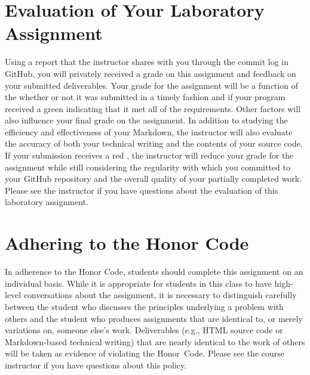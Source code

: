 \documentclass[11pt]{article}
\newcommand{\checkmark}{\ding{51}}
\newcommand{\naughtmark}{\ding{55}}
\begin{document}
\section*{Evaluation of Your Laboratory Assignment}

Using a report that the instructor shares with you through the commit log in GitHub, you will privately received a grade
on this assignment and feedback on your submitted deliverables. Your grade for the assignment will be a function of the
whether or not it was submitted in a timely fashion and if your program received a green \checkmark{} indicating that it
met all of the requirements. Other factors will also influence your final grade on the assignment. In addition to
studying the efficiency and effectiveness of your Markdown, the instructor will also evaluate the accuracy of both your
technical writing and the contents of your source code. If your submission receives a red \naughtmark{}, the instructor
will reduce your grade for the assignment while still considering the regularity with which you committed to your GitHub
repository and the overall quality of your partially completed work. Please see the instructor if you have questions
about the evaluation of this laboratory assignment.

\section*{Adhering to the Honor Code}

In adherence to the Honor Code, students should complete this assignment on an individual basis. While it is appropriate
for students in this class to have high-level conversations about the assignment, it is necessary to distinguish
carefully between the student who discusses the principles underlying a problem with others and the student who produces
assignments that are identical to, or merely variations on, someone else's work. Deliverables (e.g., HTML source code or
Markdown-based technical writing) that are nearly identical to the work of others will be taken as evidence of violating
the \mbox{Honor Code}. Please see the course instructor if you have questions about this policy.
\end{document}
